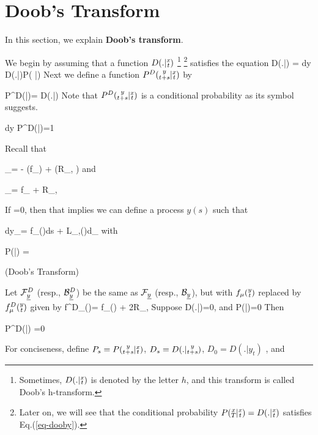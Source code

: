 \section{Doob's Transform}
In this section, we explain {\bf Doob's transform}.

We begin by assuming that a function
$D(.|{\substack{x\\t}})$ \footnote{Sometimes, $D(.|{\substack{x\\t}})$ is denoted by the letter $h$, and this transform is called Doob's h-transform.}
\footnote{Later on, we will see that the conditional probability
$P({\substack{x\\T}}|{\substack{x\\t}})=D(.|{\substack{x\\t}})$
satisfies Eq.(\ref{eq-dooby}).}
satisfies the equation
\beq
D(.|)
=
\int dy\; D(.|)P( |)
\label{eq-dooby}
\eeq
Next we define a function
$P^D({\substack{y\\t+s}}|{\substack{x\\t}})$ by

\beq
P^D(|)=
{D(.|)}
\eeq
Note that $P^D({\substack{y\\t+s}}|{\substack{x\\t}})$
is a conditional probability as its symbol
suggests.

\beq
\int dy\; P^D(|)=1
\eeq






Recall that

\beq
\calf_\rvx \bullet=
-\;
(\bullet f_\mu) +
(\bullet R_{\mu, \nu})
\eeq
and

\beq
\calb_\rvx \bullet=
f_\mu{}
 + R_{\mu, \nu}
\eeq

If
\beq
{} \phi{}=0,
\eeq
then that implies we can define a process $y(s)$
such that

\beq
dy_\mu = f_\mu()ds + L_{\mu,\nu}()d\rvB_\nu
\eeq
with

\beq
P(|) =\phi{}
\eeq


\begin{claim} (Doob's Transform)
 \label{cl-doobs-transform}

Let $\calf_\rvy^D$ (resp.,
$\calb_\rvy^{D}$) be the
	same as $\calf_\rvy$ (resp.,
	$\calb_\rvy$), but with $f_\mu({\substack{y\\t}})$
	replaced by $f^D_\mu({\substack{y\\t}})$
		given by
		\beq
		f^D_\mu()=
		f_\mu() +
		2R_{\mu, \nu}
		\eeq
Suppose
\beq
{} D(.|)=0,
\eeq
and
\beq
{}
P(|)=0
\eeq
Then
	
\beq
{}
P^D(|)
=0
\eeq

	
\end{claim}
\proof
For conciseness, define
$P_s=P({\substack{y\\t+s}}|{\substack{x\\t}})$, $D_s=D(.|{\substack{y\\t+s}})$, $D_0=D(.|y_{t})$
, and


